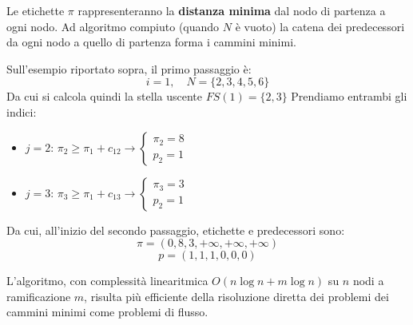 \documentclass[a4paper,11pt]{article}
\begin{document}
Le etichette $\pi$ rappresenteranno la \textbf{distanza minima} dal nodo di partenza a ogni nodo.
Ad algoritmo compiuto (quando $N$ è vuoto) la catena dei predecessori da ogni nodo a quello di partenza forma i cammini minimi.

Sull'esempio riportato sopra, il primo passaggio è:
$$ i = 1, \quad N = \{ 2, 3, 4, 5, 6 \} $$
Da cui si calcola quindi la stella uscente $FS(1) = \{ 2, 3\}$ 
Prendiamo entrambi gli indici:
\begin{itemize}
	\item $j=2$: $\pi_2 \geq \pi_1 + c_{12} \rightarrow
		\begin{cases}
			\pi_2 = 8 \\ 
			p_2 = 1
		\end{cases}
		$
	\item $j=3$: $\pi_3 \geq \pi_1 + c_{13} \rightarrow
		\begin{cases}
			\pi_3 = 3 \\ 
			p_2 = 1
		\end{cases}
		$
\end{itemize}

Da cui, all'inizio del secondo passaggio, etichette e predecessori sono:
$$
\pi = (0, 8, 3, +\infty, + \infty, +\infty)
$$
$$
p = (1, 1, 1, 0, 0, 0)
$$

L'algoritmo, con complessità linearitmica $O(n \log{n} + m \log{n})$ su $n$ nodi a ramificazione $m$, risulta più efficiente della risoluzione diretta dei problemi dei cammini minimi come problemi di flusso.
\end{document}
